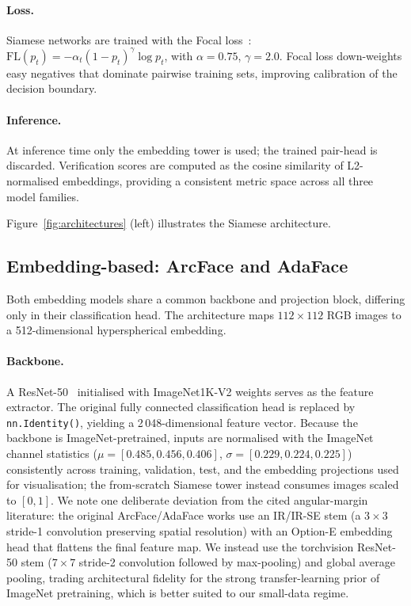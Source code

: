 \paragraph{Loss.}
Siamese networks are trained with the Focal
loss~\cite{lin2017focal}: $\mathrm{FL}(p_t) = -\alpha_t (1-p_t)^\gamma \log p_t$,
with $\alpha = 0.75$, $\gamma = 2.0$.  Focal loss down-weights easy negatives that
dominate pairwise training sets, improving calibration of the decision boundary.

\paragraph{Inference.}
At inference time only the embedding tower is used; the trained pair-head is discarded.
Verification scores are computed as the cosine similarity of L2-normalised embeddings,
providing a consistent metric space across all three model families.

Figure~\ref{fig:architectures} (left) illustrates the Siamese architecture.

\subsection{Embedding-based: ArcFace and AdaFace}

Both embedding models share a common backbone and projection block, differing only in their
classification head.  The architecture maps $112\!\times\!112$ RGB images to a
512-dimensional hyperspherical embedding.

\paragraph{Backbone.}
A ResNet-50~\cite{he2016resnet} initialised with ImageNet1K-V2 weights serves as the
feature extractor.  The original fully connected classification head is replaced by
\texttt{nn.Identity()}, yielding a 2\,048-dimensional feature vector.  Because the
backbone is ImageNet-pretrained, inputs are normalised with the ImageNet channel
statistics ($\mu=[0.485,0.456,0.406]$, $\sigma=[0.229,0.224,0.225]$) consistently
across training, validation, test, and the embedding projections used for
visualisation; the from-scratch Siamese tower instead consumes images scaled to
$[0,1]$.  We note one deliberate deviation from the cited angular-margin
literature: the original ArcFace/AdaFace works use an IR/IR-SE stem (a $3\!\times\!3$
stride-1 convolution preserving spatial resolution) with an Option-E embedding head
that flattens the final feature map.  We instead use the torchvision ResNet-50 stem
($7\!\times\!7$ stride-2 convolution followed by max-pooling) and global average
pooling, trading architectural fidelity for the strong transfer-learning prior of
ImageNet pretraining, which is better suited to our small-data regime.

